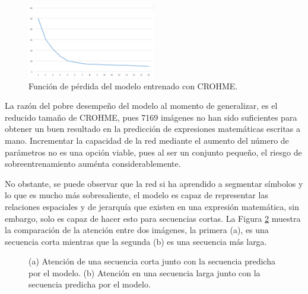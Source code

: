 \begin{figure}[H]
    \centering
    \includegraphics[width=0.5\textwidth]{capitulo5/modelo/img/modelo-crohme-loss}
    \caption{Función de pérdida del modelo entrenado con CROHME.}
    \label{fig:modelo-crohme-loss}
\end{figure}

La razón del pobre desempeño del modelo al momento de generalizar, es el reducido tamaño de CROHME, pues 7169 imágenes no han sido suficientes para obtener un buen resultado en la predicción de expresiones matemáticas escritas a mano. Incrementar la capacidad de la red mediante el aumento del número de parámetros no es una opción viable, pues al ser un conjunto pequeño, el riesgo de sobreentrenamiento auménta considerablemente.

No obstante, se puede observar que la red si ha aprendido a segmentar símbolos y lo que es mucho más sobresaliente, el modelo es capaz de representar las relaciones espaciales y de jerarquía que existen en una expresión matemática, sin embargo, solo es capaz de hacer esto para secuencias cortas. La Figura \ref{fig:modelo-crohme-attention} muestra la comparación de la atención entre dos imágenes, la primera (a), es una secuencia corta mientras que la segunda (b) es una secuencia más larga. 

\begin{figure}[H]
    \centering
    \caption{(a) Atención de una secuencia corta junto con la secuencia predicha por el modelo. (b) Atención en una secuencia larga junto con la secuencia predicha por el modelo.}
    \label{fig:modelo-crohme-attention}
\end{figure} 

